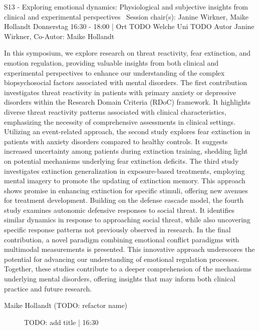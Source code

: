 
            \begin{symposium}
            {S13 - Exploring emotional dynamics: Physiological and subjective insights from clinical and experimental perspectives }
            {Session chair(s):  Janine Wirkner, Maike Hollandt}
            {Donnerstag 16:30 - 18:00 | Ort TODO}
            {Welche Uni TODO}
            Autor Janine Wirkner, Co-Autor: Maike Hollandt

In this symposium, we explore research on threat reactivity, fear extinction, and emotion regulation, providing valuable insights from both clinical and experimental perspectives to enhance our understanding of the complex biopsychosocial factors associated with mental disorders.
The first contribution investigates threat reactivity in patients with primary anxiety or depressive disorders within the Research Domain Criteria (RDoC) framework. It highlights diverse threat reactivity patterns associated with clinical characteristics, emphasizing the necessity of comprehensive assessments in clinical settings. Utilizing an event-related approach, the second study explores fear extinction in patients with anxiety disorders compared to healthy controls. It suggests increased uncertainty among patients during extinction training, shedding light on potential mechanisms underlying fear extinction deficits. The third study investigates extinction generalization in exposure-based treatments, employing mental imagery to promote the updating of extinction memory. This approach shows promise in enhancing extinction for specific stimuli, offering new avenues for treatment development. Building on the defense cascade model, the fourth study examines autonomic defensive responses to social threat. It identifies similar dynamics in response to approaching social threat, while also uncovering specific response patterns not previously observed in research. In the final contribution, a novel paradigm combining emotional conflict paradigms with multimodal measurements is presented. This innovative approach underscores the potential for advancing our understanding of emotional regulation processes. Together, these studies contribute to a deeper comprehension of the mechanisms underlying mental disorders, offering insights that may inform both clinical practice and future research.
            \begin{description}    
            
                \item [Maike Hollandt (TODO: refactor name)] TODO: add title \textcolor{mygray}{ | 16:30}    
                

\end{description}
\end{symposium}

